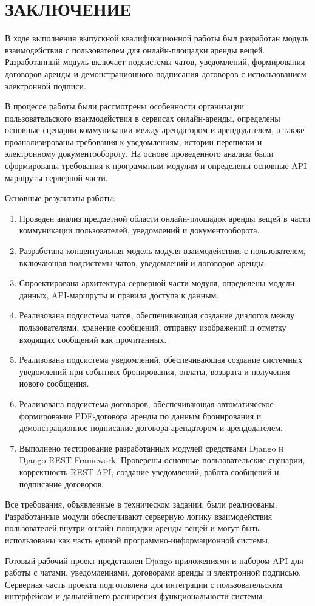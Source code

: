 \section*{ЗАКЛЮЧЕНИЕ}

В ходе выполнения выпускной квалификационной работы был разработан модуль взаимодействия с пользователем для онлайн-площадки аренды вещей. Разработанный модуль включает подсистемы чатов, уведомлений, формирования договоров аренды и демонстрационного подписания договоров с использованием электронной подписи.

В процессе работы были рассмотрены особенности организации пользовательского взаимодействия в сервисах онлайн-аренды, определены основные сценарии коммуникации между арендатором и арендодателем, а также проанализированы требования к уведомлениям, истории переписки и электронному документообороту. На основе проведенного анализа были сформированы требования к программным модулям и определены основные API-маршруты серверной части.

Основные результаты работы:

\begin{enumerate}
\item Проведен анализ предметной области онлайн-площадок аренды вещей в части коммуникации пользователей, уведомлений и документооборота.
\item Разработана концептуальная модель модуля взаимодействия с пользователем, включающая подсистемы чатов, уведомлений и договоров аренды.
\item Спроектирована архитектура серверной части модуля, определены модели данных, API-маршруты и правила доступа к данным.
\item Реализована подсистема чатов, обеспечивающая создание диалогов между пользователями, хранение сообщений, отправку изображений и отметку входящих сообщений как прочитанных.
\item Реализована подсистема уведомлений, обеспечивающая создание системных уведомлений при событиях бронирования, оплаты, возврата и получения нового сообщения.
\item Реализована подсистема договоров, обеспечивающая автоматическое формирование PDF-договора аренды по данным бронирования и демонстрационное подписание договора арендатором и арендодателем.
\item Выполнено тестирование разработанных модулей средствами Django и Django REST Framework. Проверены основные пользовательские сценарии, корректность REST API, создание уведомлений, работа сообщений и подписание договоров.
\end{enumerate}

Все требования, объявленные в техническом задании, были реализованы. Разработанные модули обеспечивают серверную логику взаимодействия пользователей внутри онлайн-площадки аренды вещей и могут быть использованы как часть единой программно-информационной системы.

Готовый рабочий проект представлен Django-приложениями и набором API для работы с чатами, уведомлениями, договорами аренды и электронной подписью. Серверная часть проекта подготовлена для интеграции с пользовательским интерфейсом и дальнейшего расширения функциональности системы.